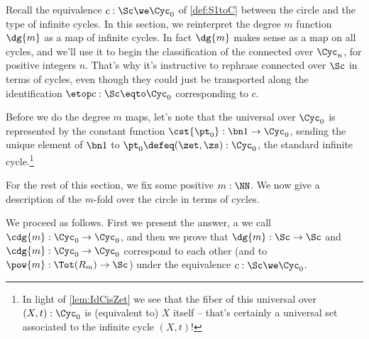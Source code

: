 Recall the equivalence $c : \Sc \we \Cyc_0$ of \cref{def:S1toC}
between the circle and the type of infinite cycles.
In this section, we reinterpret the degree $m$ function $\dg{m}$ as a
map of infinite cycles. In fact $\dg{m}$ makes sense as a map on all cycles,
and we'll use it to begin the classification
of the connected \coverings over $\Cyc_n$, for positive integers $n$.
That's why it's instructive to rephrase connected \coverings over $\Sc$
in terms of cycles, even though they could just be transported 
along the identification $\etop c:\Sc\eqto\Cyc_0$ corresponding to $c$.

Before we do the degree $m$ maps, let's note that the
universal \covering over $\Cyc_0$ is represented by the constant function
$\cst{\pt_0}:\bn 1\to\Cyc_0$, sending the unique element
of $\bn 1$ to $\pt_0\defeq(\zet,\zs):\Cyc_0$, the standard infinite cycle.\footnote{%
  In light of \cref{lem:IdCisZet} we see that the fiber
  of this universal \covering over $(X,t):\Cyc_0$ is (equivalent to) $X$ itself
  -- that's certainly a universal set associated to the
  infinite cycle $(X,t)$!}

For the rest of this section, we fix some positive $m:\NN$.
We now give a description of
the $m$-fold \covering over the circle in terms of cycles.

We proceed as follows.
First we present the answer, a \covering we call $\cdg{m}:\Cyc_0\to\Cyc_0$,
and then we prove that $\dg{m}:\Sc\to\Sc$ and $\cdg{m}:\Cyc_0\to\Cyc_0$
correspond to each other (and to $\pow{m}:\Tot(R_m)\to\Sc$)
under the equivalence $c:\Sc\we\Cyc_0$.

